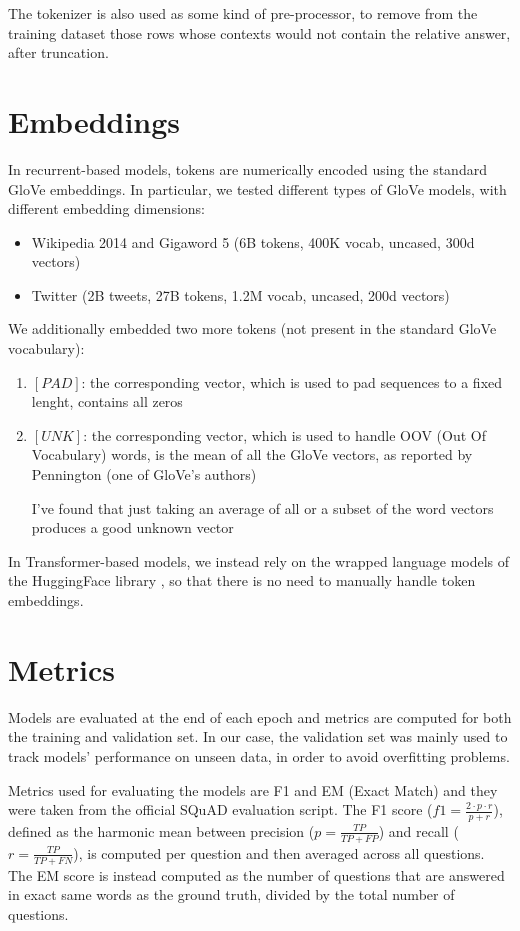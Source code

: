 \documentclass[a4paper,10pt]{report}
\begin{document}
The tokenizer is also used as some kind of pre-processor, to remove from the training dataset those rows whose contexts would not contain the relative answer, after truncation.

\section{Embeddings}\label{sec:embeddings}
In recurrent-based models, tokens are numerically encoded using the standard GloVe embeddings. In particular, we tested different types of GloVe models, with different embedding dimensions:
\begin{itemize}
  \item Wikipedia 2014 and Gigaword 5 (6B tokens, 400K vocab, uncased, 300d vectors)
  \item Twitter (2B tweets, 27B tokens, 1.2M vocab, uncased, 200d vectors)
\end{itemize}

We additionally embedded two more tokens (not present in the standard GloVe vocabulary):
\begin{enumerate}
  \item $[PAD]$: the corresponding vector, which is used to pad sequences to a fixed lenght, contains all zeros
  \item $[UNK]$: the corresponding vector, which is used to handle OOV (Out Of Vocabulary) words, is the mean of all the GloVe vectors, as reported by Pennington (one of GloVe's authors) \cite{unk}
        \begin{displayquote}I've found that just taking an average of all or a subset of the word vectors produces a good unknown vector \end{displayquote}
\end{enumerate}

In Transformer-based models, we instead rely on the wrapped language models of the HuggingFace library \cite{huggingface}, so that there is no need to manually handle token embeddings.

\section{Metrics}
Models are evaluated at the end of each epoch and metrics are computed for both the training and validation set. In our case, the validation set was mainly used to track models' performance on unseen data, in order to avoid overfitting problems.

Metrics used for evaluating the models are F1 and EM (Exact Match) and they were taken from the official SQuAD evaluation script. The F1 score ($f1=\frac{2\cdot p \cdot r}{p+r}$), defined as the harmonic mean between precision ($p=\frac{TP}{TP+FP}$) and recall ($r=\frac{TP}{TP+FN}$), is computed per question and then averaged across all questions. The EM score is instead computed as the number of questions that are answered in exact same words as the ground truth, divided by the total number of questions.
\end{document}

